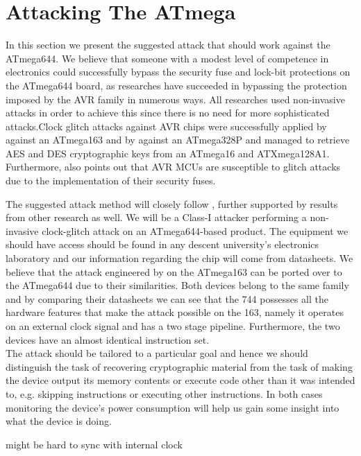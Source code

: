 \section{Attacking The ATmega}
\label{sec:attacking_mega}

In this section we present the suggested attack that should work against the ATmega644. We believe that someone with a modest level of competence in electronics could successfully bypass the security fuse and lock-bit protections on the ATmega644 board, as researches have succeeded in bypassing the protection imposed by the AVR family in numerous ways. All researches used non-invasive attacks in order to achieve this since there is no need for more sophisticated attacks.Clock glitch attacks against AVR chips were successfully applied by \citep{glitches_paper} against an ATmega163 and by \citep{chipwhisperer} against an ATmega328P and \citep{avr_mega} managed to retrieve AES and DES cryptographic keys from an ATmega16 and ATXmega128A1. Furthermore, \citep{sergei:thesis} also points out that AVR MCUs are susceptible to glitch attacks due to the implementation of their security fuses. 

The suggested attack method will closely follow \citep{glitches_paper}, further supported by results from other research as well. We will be a Class-I attacker performing a non-invasive clock-glitch attack on an ATmega644-based product. The equipment we should have access should be found in any descent university's electronics laboratory and our information regarding the chip will come from datasheets. We believe that the attack engineered by \citep{glitches_paper} on the ATmega163 can be ported over to the ATmega644 due to their similarities. Both devices belong to the same family and by comparing their datasheets we can see that the 744 possesses all the hardware features that make the attack possible on the 163, namely it operates on an external clock signal and has a two stage pipeline. Furthermore, the two devices have an almost identical instruction set.\\

The attack should be tailored to a particular goal and hence we should distinguish the task of recovering cryptographic material from the task of making the device output its memory contents or execute code other than it was intended to, e.g. skipping instructions or executing other instructions. In both cases monitoring the device's power consumption will help us gain some insight into what the device is doing. 



might be hard to sync with internal clock \citep{sergei:thesis}\citep{avr_mega}



